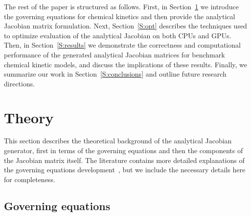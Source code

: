 \documentclass[preprint,12pt]{elsarticle}
\begin{document}
The rest of the paper is structured as follows.
First, in Section~\ref{S:theory} we introduce the governing equations for chemical kinetics and then provide the analytical Jacobian matrix formulation.
Next, Section~\ref{S:opt} describes the techniques used to optimize evaluation of the analytical Jacobian on both CPUs and GPUs.
Then, in Section~\ref{S:results} we demonstrate the correctness and computational performance of the generated analytical Jacobian matrices for benchmark chemical kinetic models, and discuss the implications of these results.
Finally, we summarize our work in Section~\ref{S:conclusions} and outline future research directions.

\section{Theory}
\label{S:theory}

This section describes the theoretical background of the analytical Jacobian generator, first in terms of the governing equations and then the components of the Jacobian matrix itself.
The literature contains more detailed explanations of the governing equations development~\cite{Law:2006tu,Warnatz:2006tq,Glassman:2008tq}, but we include the necessary details here for completeness.

\subsection{Governing equations}
\label{sec:goveq}
\end{document}
